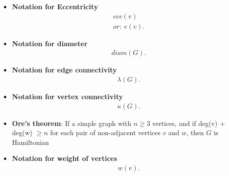 \documentclass{report}
\begin{document}
\begin{itemize}
      \item \textbf{Notation for Eccentricity}
        \begin{align*}
          ecc(v) \\
          or:\ e(v)
        .\end{align*}
      \item \textbf{Notation for diameter}
        \begin{align*}
          diam(G)
        .\end{align*}
      \item \textbf{Notation for edge connectivity}
        \begin{align*}
          \lambda(G)
        .\end{align*}
      \item \textbf{Notation for vertex connectivity}
        \begin{align*}
          \kappa(G)
        .\end{align*}
      \item \textbf{Ore's theorem}:        If a simple graph with $n \geq 3$ vertices, and if deg(v) + deg(w) $ \geq n$ for each pair of non-adjacent vertices $v$ and $w$, then $G$ is Hamiltonian 
      \item \textbf{Notation for weight of vertices}
        \begin{align*}
          w(v)
        .\end{align*}


      \end{itemize}

      \pagebreak \bigbreak \noindent 
\end{document}
